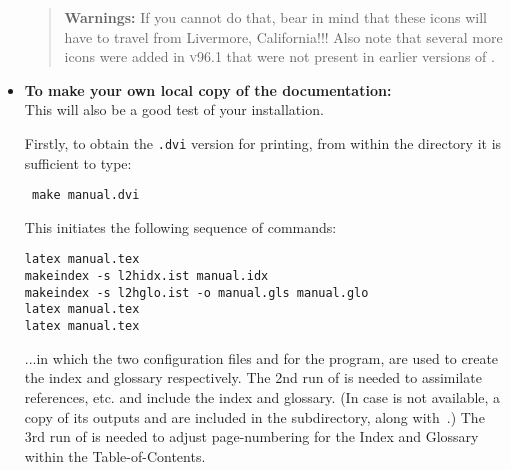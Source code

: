 \begin{itemize}
%
\begin{quotation}\noindent
\textbf{Warnings: }%
If you cannot do that, bear in mind that these icons will have
to travel from Livermore, California!!!
Also note that several more icons were added in \textsc{v96.1}
that were not present in earlier versions of \latextohtml.
\end{quotation}

%
%
\item
\textbf{To make your own local copy of the \latextohtml{}
documentation:} \\
This will also be a good test of your installation. 
%
%
\begin{changebar}%
\noindent
Firstly, to obtain the \texttt{.dvi} version for printing,
from within the  directory it is sufficient to type:

\begin{small}
\texttt{ make manual.dvi}
\end{small}

\noindent
This initiates the following sequence of commands:
\begin{small}
\begin{verbatim}
latex manual.tex
makeindex -s l2hidx.ist manual.idx
makeindex -s l2hglo.ist -o manual.gls manual.glo
latex manual.tex
latex manual.tex
\end{verbatim}
\end{small}
%
%
...in which the two configuration files  and  
for the  program, are used to create the index and glossary respectively.
The 2nd run of  is needed to assimilate references, etc.
and include the index and glossary.\html{\\}%
%
\html{\\}
(In case  is not available, a copy of its outputs  
and  are included in the  subdirectory, 
along with \,.)\html{\\}
The 3rd run of  is needed to adjust page-numbering for the Index 
and Glossary within the Table-of-Contents.


\end{changebar}
\end{itemize}
